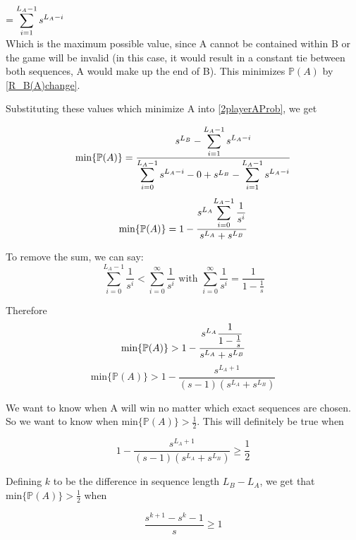 \documentclass[english,12pt,a4paper,final]{article}
\begin{document}
$=\mathlarger{\sum_{i=1}^{L_A-1}s^{L_A-i}}$
\\
Which is the maximum possible value, since A cannot be contained within B or the game will be invalid (in this case, it would result in a constant tie between both sequences, A would make up the end of B). This minimizes $\mathbb{P}(A)$ by \eqref{R_B(A)change}.

Substituting these values which minimize A into \eqref{2playerAProb}, we get

\begin{equation*}
	\text{min}\{\mathbb{P}(A)\} = \frac{s^{L_B} - \mathlarger{\sum_{i=1}^{L_A-1}s^{L_A-i}}}{\mathlarger{\sum_{i=0}^{L_A-1}s^{L_A-i}} - 0 + s^{L_B} - \mathlarger{\sum_{i=1}^{L_A-1}s^{L_A-i}}}
\end{equation*}
\begin{equation}\label{PminDifferentLengths}
	\text{min}\{\mathbb{P}(A)\} = 1 - \frac{s^{L_A}\mathlarger{\sum_{i=0}^{L_A-1}\frac{1}{s^i}}}{s^{L_A} + s^{L_B}}
\end{equation}

To remove the sum, we can say:
\begin{equation*}
	\sum_{i=0}^{L_A-1}\frac{1}{s^i} < \sum_{i=0}^{\infty}\frac{1}{s^i} \text{  with  }\sum_{i=0}^{\infty}\frac{1}{s^i} = \frac{1}{1-\frac{1}{s}}
\end{equation*}

Therefore
\begin{equation*}
	\text{min}\{\mathbb{P}(A)\} > 1 - \frac{s^{L_A}\mathlarger{\frac{1}{1-\frac{1}{s}}}}{s^{L_A} + s^{L_B}}
\end{equation*}
\begin{equation*}
	\text{min}\{\mathbb{P}(A)\} > 1 - \frac{s^{L_A+1}}{(s-1)(s^{L_A}+s^{L_B})}
\end{equation*}

We want to know when A will win no matter which exact sequences are chosen. So we want to know when $\text{min}\{\mathbb{P}(A)\} > \frac{1}{2}$. This will definitely be true when

\begin{equation*}
	1 - \frac{s^{L_A+1}}{(s-1)(s^{L_A}+s^{L_B})} \ge \frac{1}{2}
\end{equation*}

Defining $k$ to be the difference in sequence length $L_B-L_A$, we get that $\text{min}\{\mathbb{P}(A)\} > \frac{1}{2}$ when

\begin{equation*}
	\frac{s^{k+1}-s^k-1}{s} \ge 1
\end{equation*}
\end{document}
